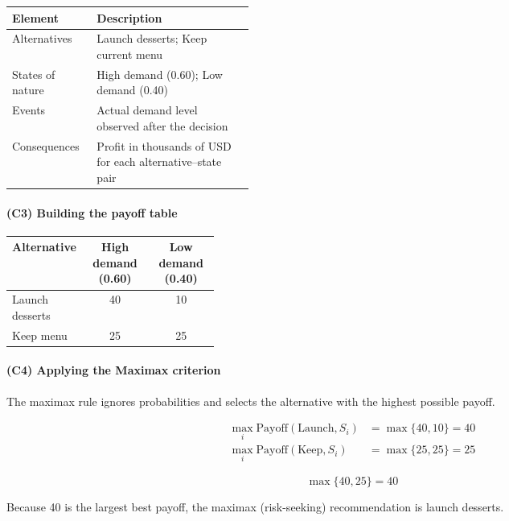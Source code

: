 \begin{center}
	\begin{tabularx}{\linewidth}{@{}L{0.35\linewidth}Y@{}}
		\toprule
		Element & Description \\
		\midrule
		Alternatives & Launch desserts; Keep current menu \\
		States of nature & High demand (0.60); Low demand (0.40) \\
		Events & Actual demand level observed after the decision \\
		Consequences & Profit in thousands of USD for each alternative--state pair \\
		\bottomrule
	\end{tabularx}
\end{center}

\paragraph{(C3) Building the payoff table}\label{subsubsec:practice-activity-1-solution-1-c3}

\begin{center}
	\begin{tabularx}{\linewidth}{@{}L{0.3\linewidth}C C@{}}
		\toprule
		Alternative & High demand (0.60) & Low demand (0.40) \\
		\midrule
		Launch desserts & 40 & 10 \\
		Keep menu & 25 & 25 \\
		\bottomrule
	\end{tabularx}
\end{center}

\paragraph{(C4) Applying the Maximax criterion}\label{subsubsec:practice-activity-1-solution-1-c4}

The maximax rule ignores probabilities and selects the alternative with the highest possible payoff.

\[
\begin{aligned}
\max_i \text{Payoff}(\text{Launch}, S_i) &= \max\{40, 10\} = 40\\
\max_i \text{Payoff}(\text{Keep}, S_i) &= \max\{25, 25\} = 25
\end{aligned}
\]

\[
\max\{40, 25\} = 40
\]

Because 40 is the largest best payoff, the maximax (risk-seeking) recommendation is launch desserts.


